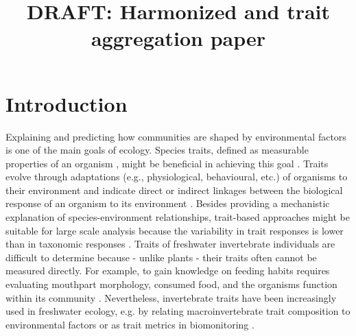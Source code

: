 \documentclass{article}
\title{DRAFT: Harmonized and trait aggregation paper }
\author{}%
\date{}
\begin{document}
\maketitle

\section*{Introduction}

Explaining and predicting how communities are shaped by environmental factors is one of the main goals of ecology. Species traits, defined as measurable properties of an organism \cite{mcgill_rebuilding_2006}, might be beneficial in achieving this goal \cite{heino_jani_macroecological_2013}. %
Traits evolve through adaptations (e.g., physiological, behavioural, etc.) of organisms to their environment and indicate direct or indirect linkages between the biological response of an organism to its environment \cite{southwood_habitat_1977, verberk_delivering_2013}.
Besides providing a mechanistic explanation of species-environment relationships, trait-based approaches might be suitable for large scale analysis because the variability in trait responses is lower than in taxonomic responses \cite{bonada_taxonomic_2007, baird_toward_2011}. Traits of freshwater invertebrate individuals are difficult to determine because - unlike plants - their traits often cannot be measured directly.
For example, to gain knowledge on feeding habits requires evaluating mouthpart morphology, consumed food, and the organisms function within its community \cite{moog_comprehensive_nodate}. 
Nevertheless, invertebrate traits have been increasingly used in freshwater ecology, e.g. by relating macroinvertebrate trait composition to environmental factors or as trait metrics in biomonitoring \cite{poff_developing_2010, szocs_effects_2014, bhowmik_large_2015, menezes_beyond_2010}.
\end{document}
